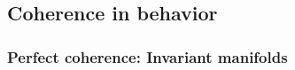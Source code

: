 \documentclass{article}
\theoremstyle{definition} \newtheorem{definition}{Definition}  \newtheorem{example}{Example}
\theoremstyle{remark} \newtheorem{remark}{Remark}
\newcounter{ct}
\begin{document}


%
%
%
%
%
%
%
%
%
%
%
%


\subsection{Coherence in behavior}
\subsubsection{Perfect coherence: Invariant manifolds}%
\end{document}
